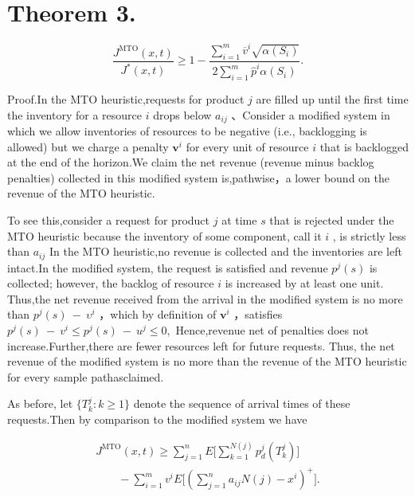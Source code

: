 \section{Theorem 3.}\label{theorem-3.}

\[
\frac { J ^ { \mathrm { M T O } } ( x , t ) } { J ^ { * } ( x , t ) } \geqslant 1 - \frac { \sum _ { i = 1 } ^ { m } \overline { { { v } } } ^ { i } \sqrt { \alpha ( S _ { i } ) } } { 2 \sum _ { i = 1 } ^ { m } \hat { p } ^ { i } \alpha ( S _ { i } ) } .
\]

Proof.In the MTO heuristic,requests for product \(j\) are filled up
until the first time the inventory for a resource \(i\) drops below
\(a _ { i j }\) 、Consider a modified system in which we allow
inventories of resources to be negative (i.e., backlogging is allowed)
but we charge a penalty \(\boldsymbol { v } ^ { i }\) for every unit of
resource \(i\) that is backlogged at the end of the horizon.We claim the
net revenue (revenue minus backlog penalties) collected in this modified
system is,pathwise，a lower bound on the revenue of the MTO heuristic.

To see this,consider a request for product \(j\) at time \(s\) that is
rejected under the MTO heuristic because the inventory of some
component, call it \(i\) , is strictly less than \(a _ { i j }\) In the
MTO heuristic,no revenue is collected and the inventories are left
intact.In the modified system, the request is satisfied and revenue
\(p ^ { j } ( s )\) is collected; however, the backlog of resource \(i\)
is increased by at least one unit. Thus,the net revenue received from
the arrival in the modified system is no more than
\(p ^ { j } ( s ) \ - \ \upsilon ^ { i }\) ，which by definition of
\(\boldsymbol { v } ^ { i }\) ，satisfies
\(p ^ { j } ( s ) ~ - ~ v ^ { i } \leqslant p ^ { j } ( s ) ~ - ~ u ^ { j } \leqslant 0 ,\)
Hence,revenue net of penalties does not increase.Further,there are fewer
resources left for future requests. Thus, the net revenue of the
modified system is no more than the revenue of the MTO heuristic for
every sample pathasclaimed.

As before, let \(\{ T _ { k } ^ { j } \colon k \geqslant 1 \}\) denote
the sequence of arrival times of these requests.Then by comparison to
the modified system we have

\[
\begin{array} { c } { { \displaystyle { J ^ { \mathrm { M T O } } ( x , t ) \geqslant \sum _ { j = 1 } ^ { n } E \Bigg [ \sum _ { k = 1 } ^ { N ( j ) } p _ { d } ^ { j } ( T _ { k } ^ { j } ) \Bigg ] } } } \\ { { \displaystyle { \qquad - \sum _ { i = 1 } ^ { m } v ^ { i } E \Bigg [ \left( \sum _ { j = 1 } ^ { n } a _ { i j } N ( j ) - x ^ { i } \right) ^ { + } \Bigg ] . } } } \end{array}
\]

